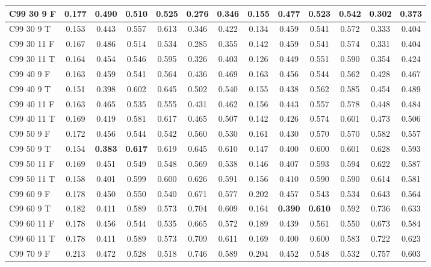 \documentclass{article}
\begin{document}
\begin{tabular}{|l|c|c|c|c|c|c||c|c|c|c|c|c|}
C99 30  9 F & 0.177 & 0.490 & 0.510 & 0.525 & 0.276 & 0.346 & 0.155 & 0.477 & 0.523 & 0.542 & 0.302 & 0.373\\ \hline
C99 30  9 T & 0.153 & 0.443 & 0.557 & 0.613 & 0.346 & 0.422 & 0.134 & 0.459 & 0.541 & 0.572 & 0.333 & 0.404\\ \hline
C99 30 11 F & 0.167 & 0.486 & 0.514 & 0.534 & 0.285 & 0.355 & 0.142 & 0.459 & 0.541 & 0.574 & 0.331 & 0.404\\ \hline
C99 30 11 T & 0.164 & 0.454 & 0.546 & 0.595 & 0.326 & 0.403 & 0.126 & 0.449 & 0.551 & 0.590 & 0.354 & 0.424\\ \hline
C99 40  9 F & 0.163 & 0.459 & 0.541 & 0.564 & 0.436 & 0.469 & 0.163 & 0.456 & 0.544 & 0.562 & 0.428 & 0.467\\ \hline
C99 40  9 T & 0.151 & 0.398 & 0.602 & 0.645 & 0.502 & 0.540 & 0.155 & 0.438 & 0.562 & 0.585 & 0.454 & 0.489\\ \hline
C99 40 11 F & 0.163 & 0.465 & 0.535 & 0.555 & 0.431 & 0.462 & 0.156 & 0.443 & 0.557 & 0.578 & 0.448 & 0.484\\ \hline
C99 40 11 T & 0.169 & 0.419 & 0.581 & 0.617 & 0.465 & 0.507 & 0.142 & 0.426 & 0.574 & 0.601 & 0.473 & 0.506\\ \hline
C99 50  9 F & 0.172 & 0.456 & 0.544 & 0.542 & 0.560 & 0.530 & 0.161 & 0.430 & 0.570 & 0.570 & 0.582 & 0.557\\ \hline
C99 50  9 T & 0.154 & \textbf{0.383} & \textbf{0.617} & 0.619 & 0.645 & 0.610 & 0.147 & 0.400 & 0.600 & 0.601 & 0.628 & 0.593\\ \hline
C99 50 11 F & 0.169 & 0.451 & 0.549 & 0.548 & 0.569 & 0.538 & 0.146 & 0.407 & 0.593 & 0.594 & 0.622 & 0.587\\ \hline
C99 50 11 T & 0.158 & 0.401 & 0.599 & 0.600 & 0.626 & 0.591 & 0.156 & 0.410 & 0.590 & 0.590 & 0.614 & 0.581\\ \hline
C99 60  9 F & 0.178 & 0.450 & 0.550 & 0.540 & 0.671 & 0.577 & 0.202 & 0.457 & 0.543 & 0.534 & 0.643 & 0.564\\ \hline
C99 60  9 T & 0.182 & 0.411 & 0.589 & 0.573 & 0.704 & 0.609 & 0.164 & \textbf{0.390} & \textbf{0.610} & 0.592 & 0.736 & 0.633\\ \hline
C99 60 11 F & 0.178 & 0.456 & 0.544 & 0.535 & 0.665 & 0.572 & 0.189 & 0.439 & 0.561 & 0.550 & 0.673 & 0.584\\ \hline
C99 60 11 T & 0.178 & 0.411 & 0.589 & 0.573 & 0.709 & 0.611 & 0.169 & 0.400 & 0.600 & 0.583 & 0.722 & 0.623\\ \hline
C99 70  9 F & 0.213 & 0.472 & 0.528 & 0.518 & 0.746 & 0.589 & 0.204 & 0.452 & 0.548 & 0.532 & 0.757 & 0.603\\ \hline

\end{tabular}
\end{document}
